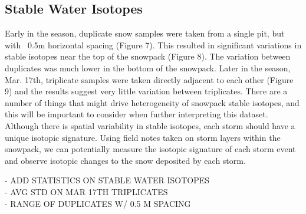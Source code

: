 \subsection{Stable Water Isotopes}
Early in the season, duplicate snow samples were taken from a single pit, but with ~0.5m horizontal spacing (Figure 7). This resulted in significant variations in stable isotopes near the top of the snowpack (Figure 8). The variation between duplicates was much lower in the bottom of the snowpack. Later in the season, Mar. 17th, triplicate samples were taken directly adjacent to each other (Figure 9) and the results suggest very little variation between triplicates. There are a number of things that might drive heterogeneity of snowpack stable isotopes, and this will be important to consider when further interpreting this dataset. Although there is spatial variability in stable isotopes, each storm should have a unique isotopic signature. Using field notes taken on storm layers within the snowpack, we can potentially measure the isotopic signature of each storm event and observe isotopic changes to the snow deposited by each storm.

- ADD STATISTICS ON STABLE WATER ISOTOPES \\
    - AVG STD ON MAR 17TH TRIPLICATES\\
    - RANGE OF DUPLICATES W/ 0.5 M SPACING\\ 